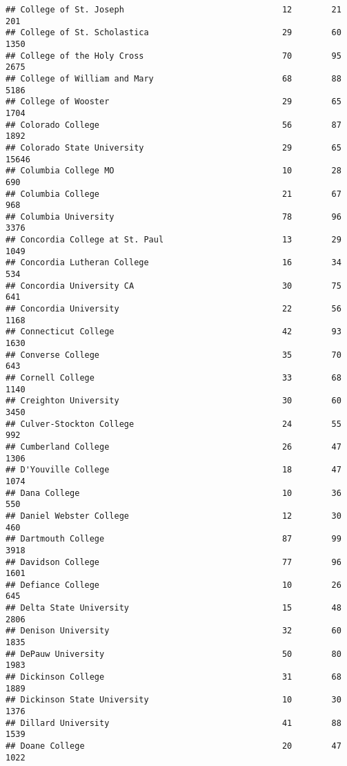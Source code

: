 \documentclass[
]{article}
\begin{document}
\begin{verbatim}
## College of St. Joseph                                12        21         201
## College of St. Scholastica                           29        60        1350
## College of the Holy Cross                            70        95        2675
## College of William and Mary                          68        88        5186
## College of Wooster                                   29        65        1704
## Colorado College                                     56        87        1892
## Colorado State University                            29        65       15646
## Columbia College MO                                  10        28         690
## Columbia College                                     21        67         968
## Columbia University                                  78        96        3376
## Concordia College at St. Paul                        13        29        1049
## Concordia Lutheran College                           16        34         534
## Concordia University CA                              30        75         641
## Concordia University                                 22        56        1168
## Connecticut College                                  42        93        1630
## Converse College                                     35        70         643
## Cornell College                                      33        68        1140
## Creighton University                                 30        60        3450
## Culver-Stockton College                              24        55         992
## Cumberland College                                   26        47        1306
## D'Youville College                                   18        47        1074
## Dana College                                         10        36         550
## Daniel Webster College                               12        30         460
## Dartmouth College                                    87        99        3918
## Davidson College                                     77        96        1601
## Defiance College                                     10        26         645
## Delta State University                               15        48        2806
## Denison University                                   32        60        1835
## DePauw University                                    50        80        1983
## Dickinson College                                    31        68        1889
## Dickinson State University                           10        30        1376
## Dillard University                                   41        88        1539
## Doane College                                        20        47        1022

\end{verbatim}
\end{document}
